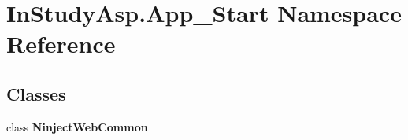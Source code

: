 \hypertarget{namespace_in_study_asp_1_1_app___start}{}\section{In\+Study\+Asp.\+App\+\_\+\+Start Namespace Reference}
\label{namespace_in_study_asp_1_1_app___start}
\subsection*{Classes}
\begin{DoxyCompactItemize}
\item 
class {\bfseries Ninject\+Web\+Common}
\end{DoxyCompactItemize}
